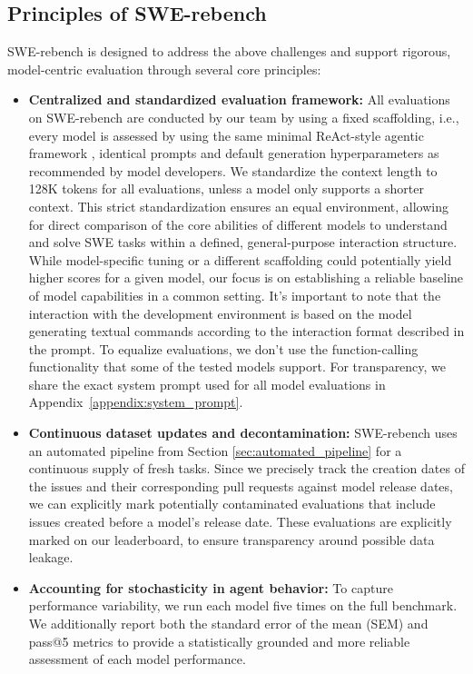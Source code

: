 \documentclass[dandb]{article}
\begin{document}
\subsection{Principles of SWE-rebench}

SWE-rebench is designed to address the above challenges and support rigorous, model-centric evaluation through several core principles:

\begin{itemize}
    \item \textbf{Centralized and standardized evaluation framework:} All evaluations on SWE-rebench are conducted by our team by using a fixed scaffolding, i.e., every model is assessed by using the same minimal ReAct-style agentic framework \citep{yao2023reactsynergizingreasoningacting}, identical prompts and default generation hyperparameters as recommended by model developers. We standardize the context length to 128K tokens for all evaluations, unless a model only supports a shorter context. \newline
    This strict standardization ensures an equal environment, allowing for direct comparison of the core abilities of different models to understand and solve SWE tasks within a defined, general-purpose interaction structure. While model-specific tuning or a different scaffolding could potentially yield higher scores for a given model, our focus is on establishing a reliable baseline of model capabilities in a common setting. \newline
    It’s important to note that the interaction with the development environment is based on the model generating textual commands according to the interaction format described in the prompt. To equalize evaluations, we don’t use the function-calling functionality that some of the tested models support. For transparency, we share the exact system prompt used for all model evaluations in Appendix~\ref{appendix:system_prompt}.
    \item \textbf{Continuous dataset updates and decontamination:} SWE-rebench uses an automated pipeline from Section \ref{sec:automated_pipeline} for a continuous supply of fresh tasks. Since we precisely track the creation dates of the issues and their corresponding pull requests against model release dates, we can explicitly mark potentially contaminated evaluations that include issues created before a model’s release date. These evaluations are explicitly marked on our leaderboard, to ensure transparency around possible data leakage.
    \item \textbf{Accounting for stochasticity in agent behavior:} To capture performance variability, we run each model five times on the full benchmark. We additionally report both the standard error of the mean (SEM) and pass@5 metrics to provide a statistically grounded and more reliable assessment of each model performance.
\end{itemize}
\end{document}
